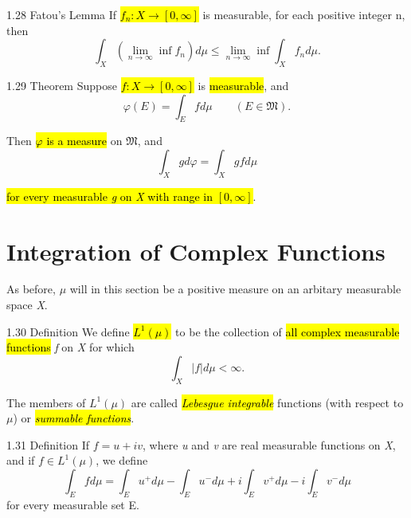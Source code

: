 \documentclass{article}
\begin{document}
\begin{theo}{1.28 Fatou's Lemma}
If \hl{$f_n:X\rightarrow[0,\infty]$} is measurable, for each positive integer n, then
\begin{displaymath}
  \int_X(\lim_{n\rightarrow\infty}\inf f_n)d\mu\le\lim_{n\rightarrow\infty}\inf\int_X f_nd\mu.
\end{displaymath}
	
\end{theo}

\begin{theo}{1.29 Theorem}
Suppose \hl{$f: X\rightarrow[0,\infty]$} is \hl{measurable}, and
\begin{displaymath}
  \varphi(E)=\int_E fd\mu\qquad (E\in\mathfrak{M}).
\end{displaymath}

Then \hl{$\varphi$ is a measure} on $\mathfrak{M}$, and
\begin{displaymath}
  \int_X gd\varphi=\int_X gfd\mu
\end{displaymath}

\hl{for every measurable \textit{g} on \textit{X} with range in $[0,\infty]$}.

\end{theo}

\section*{Integration of Complex Functions}
As before, $\mu$ will in this section be a positive measure on an arbitary measurable space \textit{X}.

\begin{defi}{1.30 Definition}
We define \hl{$L^1(\mu)$} to be the collection of \hl{all complex measurable functions} \textit{f} on \textit{X} for which
\begin{displaymath}
  \int_X|f|d\mu<\infty.
\end{displaymath}
	
	The members of $L^1(\mu)$ are called \hl{\textit{Lebesgue integrable}} functions (with respect to $\mu$) or \hl{\textit{summable functions}}.
\end{defi}

\begin{defi}{1.31 Definition}
If $f=u+iv$, where \textit{u} and \textit{v} are real measurable functions on \textit{X}, and if $f\in L^1(\mu)$, we define
\begin{displaymath}
  \int_E fd\mu=\int_E u^+d\mu-\int_E u^-d\mu+i\int_E v^+d\mu-i\int_E v^-d\mu
\end{displaymath}
	for every measurable set E.
\end{defi}
\end{document}
